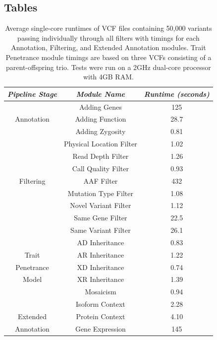 \documentclass[twocolumn]{bmcart}%
\begin{document}
\begin{backmatter}
\section*{Tables}

\begin{table}[h!]
\begin{tabular}{| c | *2c |} \hline %
\emph{Pipeline Stage} & \emph{Module Name} & \emph{Runtime (seconds)} \\
\hline
             & Adding Genes     & 125\\
Annotation   & Adding Function & 28.7\\
             & Adding Zygosity & 0.81\\
\hline
             & Physical Location Filter & 1.02 \\
             & Read Depth Filter        & 1.26 \\
             & Call Quality Filter      & 0.93\\
Filtering    & AAF Filter               & 432\\
             & Mutation Type Filter     & 1.08\\
             & Novel Variant Filter     & 1.12\\
             & Same Gene Filter       & 22.5\\
             & Same Variant Filter    & 26.1\\
\hline
             & AD Inheritance    & 0.83\\
 Trait       & AR Inheritance    & 1.22\\
Penetrance   & XD Inheritance    & 0.74\\
  Model      & XR Inheritance    & 1.39\\
             & Mosaicism         & 0.94\\
\hline
                 & Isoform Context      & 2.28\\
   Extended      & Protein Context      & 4.10\\
 Annotation      & Gene Expression      & 145\\
\hline
\end{tabular}
\vspace{1ex}
\caption{Average single-core runtimes of VCF files containing 50,000 variants passing individually through all filters with timings for each Annotation, Filtering, and Extended Annotation modules. Trait Penetrance module timings are based on three VCFs consisting of a parent-offspring trio. Tests were run on a 2GHz dual-core processor with 4GB RAM.}\label{table:results}
\end{table}





\end{backmatter}
\end{document}
